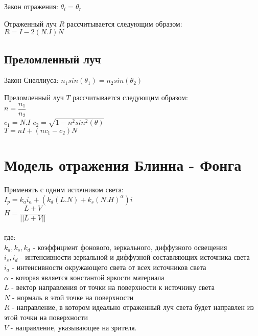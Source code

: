 Закон отражения: $\theta_i = \theta_r$

Отраженный луч $R$ рассчитывается следующим образом:\\

$
R = I - 2 (N.I)N
$

\subsection*{Преломленный луч}

Закон Снеллиуса: $n_1 sin(\theta_1) = n_2 sin(\theta_2)$

Преломленный луч $T$ рассчитывается следующим образом:\\

$n = \dfrac{n_1}{n_2}$\\

$c_1 = N.I$\qquad
$c_2 = \sqrt{1-n^2 sin^2(\theta)}$\\

$T = nI + (nc_1 - c_2)N$






\section{Модель отражения Блинна - Фонга}

Применять с одним источником света:\\

$
\displaystyle I_p = k_ai_a + (k_d(L.N) + k_s(N.H)^\alpha) i
$\\

$
H = \dfrac{L + V}{||L + V||}
$
\\\\
где:\\
$k_a, k_s, k_d$ - коэффициент фонового, зеркального, диффузного освещения\\
$i_s, i_d$ - интенсивности зеркальной и диффузной составляющих источника света\\
$i_a$ - интенсивности окружающего света от всех источников света\\
$\alpha$ - которая является константой яркости материала\\
$L$ - вектор направления от точки на поверхности к источнику света\\
$N$ - нормаль в этой точке на поверхности\\
$R$ - направление, в котором идеально отраженный луч света будет направлен из этой точки на поверхности\\
$V$ - направление, указывающее на зрителя.


